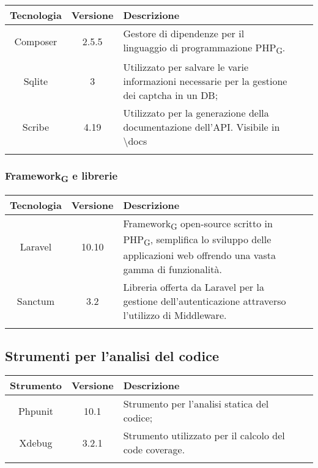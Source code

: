 \begin{center}
\setlength\extrarowheight{5pt}
\renewcommand\tabularxcolumn[1]{>{\Centering}m{#1}}
\begin{tabularx}{\textwidth}{| c | c | X | X | X |} 
	\hline
	\rowcolor{white}
	\textbf{Tecnologia} & \textbf{Versione} & \textbf{Descrizione}\\
	\hline
	Composer & 2.5.5 &  Gestore di dipendenze per il linguaggio di programmazione PHP\textsubscript{G}.\\
	\hline
	Sqlite & 3 & Utilizzato per salvare le varie informazioni necessarie per la gestione dei captcha in un DB;\\
	\hline
	Scribe & 4.19 & Utilizzato per la generazione della documentazione dell'API. Visibile in \textbackslash docs\\
	\rowcolor{white}
	\caption{Strumenti utilizzati}
\end{tabularx}
\end{center}
\newpage
\subsubsection{Framework\textsubscript{G} e librerie}

\begin{center}
\setlength\extrarowheight{5pt}
\renewcommand\tabularxcolumn[1]{>{\Centering}m{#1}}
\begin{tabularx}{\textwidth}{| c | c | X | X | X |} 
	\hline
	\rowcolor{white}
	\textbf{Tecnologia} & \textbf{Versione} & \textbf{Descrizione}\\
	\hline
	Laravel & 10.10 & Framework\textsubscript{G} open-source scritto in PHP\textsubscript{G}, semplifica lo sviluppo delle applicazioni web offrendo una vasta gamma di funzionalità.\\
	\hline
	Sanctum & 3.2 & Libreria offerta da Laravel per la gestione dell'autenticazione attraverso l'utilizzo di Middleware.\\
	\hline
	\rowcolor{white}
	\caption{Framework\textsubscript{G} e librerie utilizzati}
\end{tabularx}
\end{center}

\subsection{Strumenti per l’analisi del codice}

\begin{center}
\setlength\extrarowheight{5pt}
\renewcommand\tabularxcolumn[1]{>{\Centering}m{#1}}
\begin{tabularx}{\textwidth}{| c | c | X | X | X |} 
	\hline
	\rowcolor{white}
	\textbf{Strumento} & \textbf{Versione} & \textbf{Descrizione}\\
	\hline
	Phpunit & 10.1 & Strumento per l'analisi statica del codice;\\
	\hline
	Xdebug & 3.2.1 & Strumento utilizzato per il calcolo del code coverage.\\
	\hline
	\rowcolor{white}
	\caption{Strumenti per analisi utilizzati}
\end{tabularx}
\end{center}